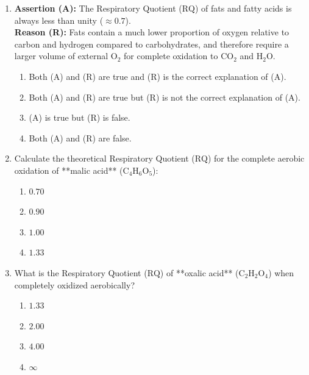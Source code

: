 \documentclass[11pt, a4paper]{article}
\begin{document}
\begin{enumerate}[label=\textbf{\arabic*.}]
\item \textbf{Assertion (A):} The Respiratory Quotient ($\text{RQ}$) of fats and fatty acids is always less than unity ($\approx 0.7$). \\
\textbf{Reason (R):} Fats contain a much lower proportion of oxygen relative to carbon and hydrogen compared to carbohydrates, and therefore require a larger volume of external $\text{O}_2$ for complete oxidation to $\text{CO}_2$ and $\text{H}_2\text{O}$.
\begin{enumerate}[label=(\Alph*)]
    \item Both (A) and (R) are true and (R) is the correct explanation of (A).
    \item Both (A) and (R) are true but (R) is not the correct explanation of (A).
    \item (A) is true but (R) is false.
    \item Both (A) and (R) are false.
\end{enumerate}

\item Calculate the theoretical Respiratory Quotient ($\text{RQ}$) for the complete aerobic oxidation of **malic acid** ($\text{C}_4\text{H}_6\text{O}_5$):
\begin{enumerate}[label=(\Alph*)]
    \item $0.70$
    \item $0.90$
    \item $1.00$
    \item $1.33$
\end{enumerate}

\item What is the Respiratory Quotient ($\text{RQ}$) of **oxalic acid** ($\text{C}_2\text{H}_2\text{O}_4$) when completely oxidized aerobically?
\begin{enumerate}[label=(\Alph*)]
    \item $1.33$
    \item $2.00$
    \item $4.00$
    \item $\infty$
\end{enumerate}


\end{enumerate}
\end{document}

